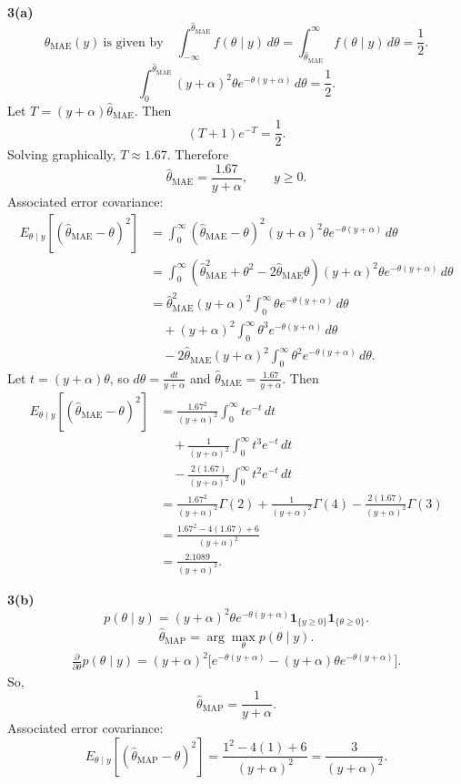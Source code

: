 \documentclass[12pt,a4paper,onecolumn]{exam}
\begin{document}
\begin{solution}
\textbf{3(a)}
\[
\hat\theta_{\mathrm{MAE}}(y)\ \text{is given by}
\quad
\int_{-\infty}^{\hat\theta_{\mathrm{MAE}}} f(\theta\mid y)\,d\theta
=\int_{\hat\theta_{\mathrm{MAE}}}^{\infty} f(\theta\mid y)\,d\theta
=\frac12.
\]
\[
\int_0^{\hat\theta_{\mathrm{MAE}}}(y+\alpha)^2\theta e^{-\theta(y+\alpha)}\,d\theta=\frac12.
\]
Let $T=(y+\alpha)\hat\theta_{\mathrm{MAE}}$. Then
\[
(T+1)e^{-T}=\frac12.
\]
Solving graphically, $T\approx 1.67$. Therefore
\[
\hat\theta_{\mathrm{MAE}}=\frac{1.67}{y+\alpha},\qquad y\ge0.
\]
Associated error covariance:
\begin{align*}
E_{\theta\mid y}\!\left[(\hat\theta_{\mathrm{MAE}}-\theta)^2\right]
&=\int_0^\infty (\hat\theta_{\mathrm{MAE}}-\theta)^2
(y+\alpha)^2\theta e^{-\theta(y+\alpha)}\,d\theta\\
&=\int_0^\infty\left(\hat\theta_{\mathrm{MAE}}^2+\theta^2-2\hat\theta_{\mathrm{MAE}}\theta\right)
(y+\alpha)^2\theta e^{-\theta(y+\alpha)}\,d\theta\\
&=\hat\theta_{\mathrm{MAE}}^2 (y+\alpha)^2\int_0^\infty \theta e^{-\theta(y+\alpha)}\,d\theta\\
&\quad +(y+\alpha)^2\int_0^\infty \theta^3 e^{-\theta(y+\alpha)}\,d\theta\\
&\quad -2\hat\theta_{\mathrm{MAE}}(y+\alpha)^2\int_0^\infty \theta^2 e^{-\theta(y+\alpha)}\,d\theta.
\end{align*}
Let $t=(y+\alpha)\theta$, so $d\theta=\frac{dt}{y+\alpha}$ and $\hat\theta_{\mathrm{MAE}}=\frac{1.67}{y+\alpha}$. Then
\begin{align*}
E_{\theta\mid y}\!\left[(\hat\theta_{\mathrm{MAE}}-\theta)^2\right]
&=\frac{1.67^2}{(y+\alpha)^2}\int_0^\infty t e^{-t}\,dt\\
&\quad +\frac{1}{(y+\alpha)^2}\int_0^\infty t^3 e^{-t}\,dt\\
&\quad -\frac{2(1.67)}{(y+\alpha)^2}\int_0^\infty t^2 e^{-t}\,dt\\
&=\frac{1.67^2}{(y+\alpha)^2}\Gamma(2)
+\frac{1}{(y+\alpha)^2}\Gamma(4)
-\frac{2(1.67)}{(y+\alpha)^2}\Gamma(3)\\
&=\frac{1.67^2-4(1.67)+6}{(y+\alpha)^2}\\
&=\frac{2.1089}{(y+\alpha)^2}.
\end{align*}

\textbf{3(b)}
\[
p(\theta\mid y)=(y+\alpha)^2\theta e^{-\theta(y+\alpha)}\mathbf{1}_{\{y\ge0\}}\mathbf{1}_{\{\theta\ge0\}}.
\]
\[
\hat\theta_{\mathrm{MAP}}=\arg\max_\theta p(\theta\mid y).
\]
\begin{align*}
\frac{\partial}{\partial\theta}p(\theta\mid y)
=(y+\alpha)^2\Big[
e^{-\theta(y+\alpha)}
-(y+\alpha)\theta e^{-\theta(y+\alpha)}
\Big].
\end{align*}
So,
\[
\hat\theta_{\mathrm{MAP}}=\frac{1}{y+\alpha}.
\]
Associated error covariance:
\[
E_{\theta\mid y}\!\left[(\hat\theta_{\mathrm{MAP}}-\theta)^2\right]
=\frac{1^2-4(1)+6}{(y+\alpha)^2}
=\frac{3}{(y+\alpha)^2}.
\]


\end{solution}
\end{document}
